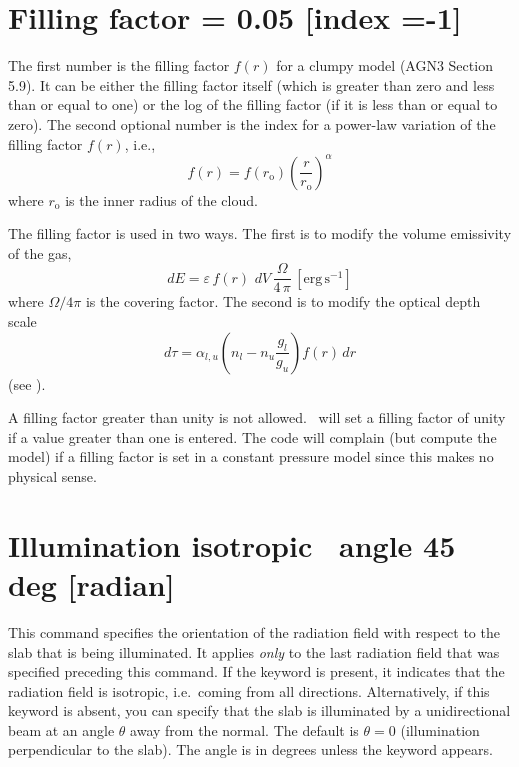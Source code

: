 \section{Filling factor = 0.05 [index =-1]}
\label{sec:CommandFillingFactor}

The first number is the filling factor $f(r)$ for a clumpy model (AGN3
Section 5.9).
It can be either the filling factor itself (which is greater
than zero and less than or equal to one) or the log of the filling factor
(if it is less than or equal to zero).
The second optional number is the
index  for a power-law variation of the filling factor $f(r)$, i.e.,
\begin{equation}
f\left( r \right) = f\left( {r_{\mathrm{o}} } \right)\left( {\frac{r}{{r_{\mathrm{o}}
}}} \right)^\alpha
\end{equation}
where $r_{\mathrm{o}}$ is the inner radius of the cloud.

The filling factor is used in two ways.  The first is to modify the volume
emissivity of the gas,
\begin{equation}
dE = \varepsilon \,f\left( r \right)\,\,dV\,\frac{\Omega }{{4\,\pi }}
\,[\mathrm{erg\, s}^{-1}]%
\end{equation}
where $\Omega/4\pi$ is the covering factor.
The second is to modify the optical depth scale
\begin{equation}
d\tau  = \alpha _{l,u} \left( {n_l  - n_u \frac{{g_l }}{{g_u }}}
\right)f\left( r \right)\,dr
\end{equation}
(see \citealp{Osterbrock1959}).

A filling factor greater than unity is not allowed.  \Cloudy\ will set
a filling factor of unity if a value greater than one is entered.   The
code will complain (but compute the model) if a filling factor is set in
a constant pressure model since this makes no physical sense.

\section{Illumination isotropic \OR\ angle 45 deg [radian]}

This command specifies the orientation of the radiation field with respect
to the slab that is being illuminated. It applies {\em only}
to the last radiation field that was specified preceding this command.
If the keyword  is present, it indicates that the
radiation field is isotropic, i.e.\ coming from all directions.
Alternatively, if this keyword is absent, you can specify that the
slab is illuminated by a unidirectional beam at an angle $\theta$
away from the normal.
The default is $\theta = 0$ (illumination perpendicular to the slab).
The angle is in degrees unless
the keyword  appears.

